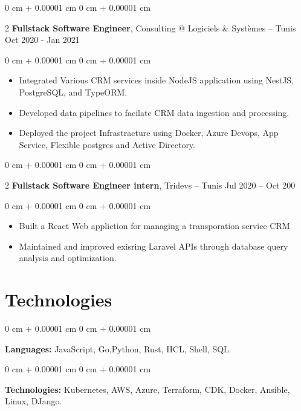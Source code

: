 \documentclass[10pt, letterpaper]{article}
\newenvironment{highlights}{ \begin{itemize}[ topsep=0.10 cm, parsep=0.10 cm, partopsep=0pt,
itemsep=0pt, leftmargin=0 cm + 10pt ] }{ \end{itemize} } %
\newenvironment{onecolentry}{ \begin{adjustwidth}{ 0 cm + 0.00001 cm }{ 0 cm + 0.00001 cm }
}{ \end{adjustwidth} } %
\newenvironment{twocolentry}[2][]{ \onecolentry \def\secondColumn{#2} \setcolumnwidth{\fill, 4.5 cm}
\begin{paracol}{2} }{ \switchcolumn \raggedleft \secondColumn \end{paracol}
\endonecolentry } %
\begin{document}
    \begin{twocolentry}
        { Oct 2020 - Jan 2021 } \textbf{Fullstack Software Engineer}, Consulting @ Logiciels \& Systèmes -- 
        Tunis
    \end{twocolentry}

    \vspace{0.10 cm}
    \begin{onecolentry}
        \begin{highlights}
        \item Integrated Various CRM services inside NodeJS application using NestJS, PostgreSQL, and TypeORM.
        \item Developed data pipelines to facilate CRM data ingestion and processing.
        \item Deployed the project Infrastracture using Docker, Azure Devops, App Service, Flexible postgres and  Active Directory. 
        \end{highlights}
    \end{onecolentry}

	\vspace{0.3 cm}
    \begin{twocolentry}
        { Jul 2020 – Oct 200 } \textbf{Fullstack Software Engineer intern}, Tridevs -- 
        Tunis
    \end{twocolentry}

    \vspace{0.10 cm}
    \begin{onecolentry}
        \begin{highlights}
        \item Built a React Web appliction for managing a transporation service CRM
        \item Maintained and improved exisring Laravel APIs through database query analysis and optimization.
        \end{highlights}
    \end{onecolentry}

	\section{Technologies}
	\begin{onecolentry}
		\textbf{Languages:} JavaScript, Go,Python, Rust, HCL, Shell, SQL.
	\end{onecolentry}

	\vspace{0.2 cm}

	\begin{onecolentry}
		\textbf{Technologies:} Kubernetes, AWS, Azure, Terraform, CDK, Docker, Ansible, Linux, DJango.
	\end{onecolentry}
\end{document}
